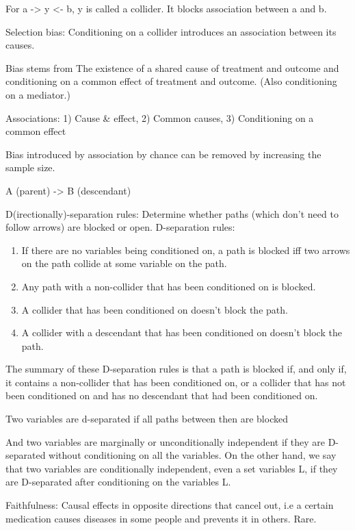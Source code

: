 \documentclass[]{book}
\begin{document}
For a -\textgreater{} y \textless{}- b, y is called a collider. It blocks association between a and b.

Selection bias: Conditioning on a collider introduces an association between its causes.

Bias stems from The existence of a shared cause of treatment and outcome and conditioning on a common effect of treatment and outcome. (Also conditioning on a mediator.)

Associations: 1) Cause \& effect, 2) Common causes, 3) Conditioning on a common effect

Bias introduced by association by chance can be removed by increasing the sample size.

A (parent) -\textgreater{} B (descendant)

D(irectionally)-separation rules: Determine whether paths (which don't need to follow arrows) are blocked or open.
D-separation rules:

\begin{enumerate}
\def\labelenumi{\arabic{enumi}.}
\item
  If there are no variables being conditioned on, a path is blocked iff two arrows on the path collide at some
  variable on the path.
\item
  Any path with a non-collider that has been conditioned on is blocked.
\item
  A collider that has been conditioned on doesn't block the path.
\item
  A collider with a descendant that has been conditioned on doesn't block the path.
\end{enumerate}

The summary of these D-separation rules is that a path is blocked if, and only if, it
contains a non-collider that has been conditioned on, or a collider that has not been conditioned on
and has no descendant that had been conditioned on.

Two variables are d-separated if all paths between then are blocked

And two variables are marginally or unconditionally independent if they are D-separated without conditioning
on all the variables. On the other hand, we say that two variables are conditionally independent, even a set variables L, if they are D-separated after conditioning on the variables L.

Faithfulness: Causal effects in opposite directions that cancel out, i.e a certain medication causes diseases in some
people and prevents it in others. Rare.
\end{document}
